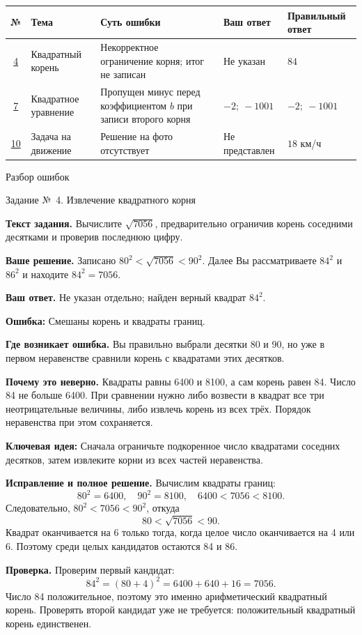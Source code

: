 \documentclass[a4paper,12pt]{article}
\newcommand{\task}[2]{\clearpage\phantomsection\label{task:#1}{\Large\color{accent} Задание №~#1. #2}\par\vspace{3pt}{\color{accent}\hrule}\vspace{6pt}}
\newcommand{\parttitle}[1]{\par\textbf{#1.}\enspace}
\newcommand{\err}[1]{\par\textcolor{red!75!black}{\textbf{Ошибка:}} #1}
\newcommand{\idea}[1]{\par\textcolor{blue!60!black}{\textbf{Ключевая идея:}} #1}
\begin{document}
\noindent\begin{tabularx}{\linewidth}{@{}c >{\raggedright\arraybackslash}p{27mm} >{\raggedright\arraybackslash}X >{\raggedright\arraybackslash}p{27mm} >{\raggedright\arraybackslash}p{28mm}@{}}
\toprule
№ & Тема & Суть ошибки & Ваш ответ & Правильный ответ\\
\midrule
\hyperref[task:4]{4} & Квадратный корень & Некорректное ограничение корня; итог не записан & Не указан & $84$\\
\hyperref[task:7]{7} & Квадратное уравнение & Пропущен минус перед коэффициентом $b$ при записи второго корня & $-2;\ -1001$ & $-2;\ -1001$\\
\hyperref[task:10]{10} & Задача на движение & Решение на фото отсутствует & Не представлен & $18$ км/ч\\
\bottomrule
\end{tabularx}
\clearpage
\thispagestyle{empty}
\vspace*{\fill}
\begin{center}{\Huge\color{accent} Разбор ошибок}\end{center}
\vspace*{\fill}
\task{4}{Извлечение квадратного корня}
\parttitle{Текст задания} Вычислите $\sqrt{7056}$, предварительно ограничив корень соседними десятками и проверив последнюю цифру.
\parttitle{Ваше решение} Записано $80^2<\sqrt{7056}<90^2$. Далее Вы рассматриваете $84^2$ и $86^2$ и находите $84^2=7056$.
\parttitle{Ваш ответ} Не указан отдельно; найден верный квадрат $84^2$.
\err{Смешаны корень и квадраты границ.}
\parttitle{Где возникает ошибка} Вы правильно выбрали десятки 80 и 90, но уже в первом неравенстве сравнили корень с квадратами этих десятков.
\parttitle{Почему это неверно} Квадраты равны 6400 и 8100, а сам корень равен 84. Число 84 не больше 6400. При сравнении нужно либо возвести в квадрат все три неотрицательные величины, либо извлечь корень из всех трёх. Порядок неравенства при этом сохраняется.
\idea{Сначала ограничьте подкоренное число квадратами соседних десятков, затем извлеките корни из всех частей неравенства.}
\parttitle{Исправление и полное решение} Вычислим квадраты границ:
\[80^2=6400,\quad 90^2=8100,\quad 6400<7056<8100.\]
Следовательно, $80^2<7056<90^2$, откуда
\[80<\sqrt{7056}<90.\]
Квадрат оканчивается на 6 только тогда, когда целое число оканчивается на 4 или 6. Поэтому среди целых кандидатов остаются 84 и 86.
\parttitle{Проверка} Проверим первый кандидат:
\[84^2=(80+4)^2=6400+640+16=7056.\]
Число 84 положительное, поэтому это именно арифметический квадратный корень. Проверять второй кандидат уже не требуется: положительный квадратный корень единственен.
\end{document}
